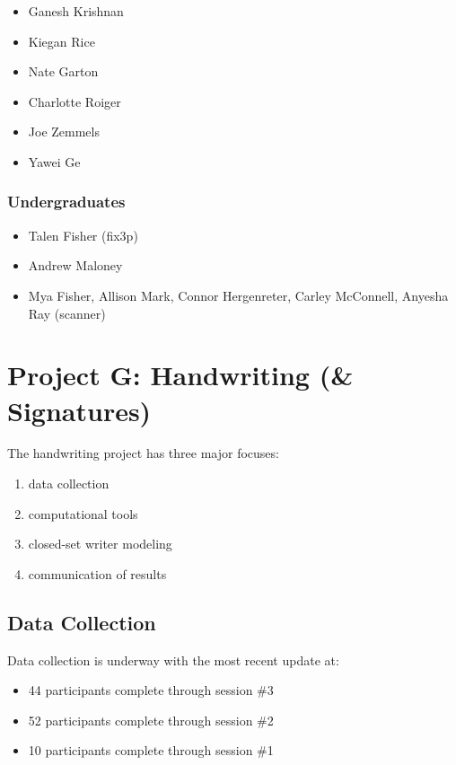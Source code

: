\documentclass[]{book}
\providecommand{\tightlist}{%
  \setlength{\itemsep}{0pt}\setlength{\parskip}{0pt}}
\begin{document}
\begin{itemize}
\tightlist
\item
  Ganesh Krishnan
\item
  Kiegan Rice
\item
  Nate Garton
\item
  Charlotte Roiger
\item
  Joe Zemmels
\item
  Yawei Ge
\end{itemize}

\hypertarget{undergraduates}{%
\subsection{Undergraduates}\label{undergraduates}}

\begin{itemize}
\tightlist
\item
  Talen Fisher (fix3p)
\item
  Andrew Maloney
\item
  Mya Fisher, Allison Mark, Connor Hergenreter, Carley McConnell, Anyesha Ray (scanner)
\end{itemize}

\hypertarget{project-g-handwriting-signatures}{%
\chapter{Project G: Handwriting (\& Signatures)}\label{project-g-handwriting-signatures}}

The handwriting project has three major focuses:

\begin{enumerate}
\def\labelenumi{\arabic{enumi}.}
\tightlist
\item
  data collection
\item
  computational tools
\item
  closed-set writer modeling
\item
  communication of results
\end{enumerate}

\hypertarget{data-collection-1}{%
\section{Data Collection}\label{data-collection-1}}

Data collection is underway with the most recent update at:

\begin{itemize}
\tightlist
\item
  44 participants complete through session \#3
\item
  52 participants complete through session \#2
\item
  10 participants complete through session \#1
\end{itemize}
\end{document}
